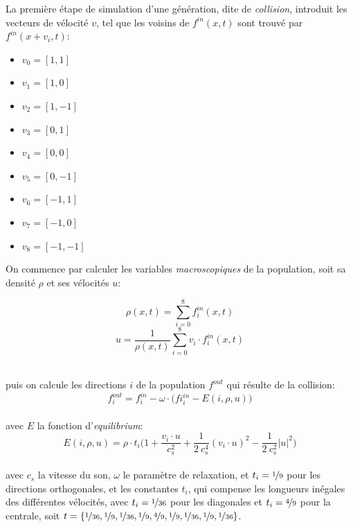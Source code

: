 La première étape de simulation d'une génération, dite de \textit{collision}, introduit les vecteurs de vélocité $v$,  tel que les voisins de $f^{in}(x, t)$ sont trouvé par $f^{in}(x+v_i,t)$: 
\begin{multicols}{3}
\begin{itemize}
\item[] $v_0 = [1,1]$
\item[] $v_1 = [1,0]$
\item[] $v_2 = [1,-1]$
\item[] $v_3 = [0,1]$
\item[] $v_4 = [0,0]$
\item[] $v_5 = [0,-1]$
\item[] $v_6 = [-1,1]$
\item[] $v_7 = [-1,0]$
\item[] $v_8 = [-1,-1]$
\end{itemize}
\end{multicols}

On commence par calculer les variables \textit{macroscopiques} de la population, soit sa densité $\rho$ et ses vélocités $u$:\\[-2\baselineskip]
\begin{multicols}{2}
\begin{equation}
\rho(x, t) = \sum_{i=0}^{8} f^{in}_i(x,t)
\end{equation}
\begin{equation}
u = \frac{1}{\rho(x,t)}\sum_{i=0}^{8} v_i \cdot f^{in}_i(x,t)
\end{equation}
\end{multicols}~\\[-0.5\baselineskip]
\noindent puis on calcule les directions $i$ de la population $f^{out}$ qui résulte de la collision:
\begin{equation}
f^{out}_i = f^{in}_i - \omega \cdot \big(fi^{in}_i - E(i, \rho, u) \big)
\end{equation}\\[-\baselineskip]

\noindent avec $E$ la fonction d'\textit{equilibrium}:
\begin{equation}
E(i, \rho, u) = \rho\cdot t_i \bigg(  1 + \frac{v_i \cdot u}{c^2_s} + \frac{1}{2~c^4_s} (v_i \cdot u)^2 - \frac{1}{2~c^2_s} |u|^2 \bigg)
\end{equation}\\[-\baselineskip]

\noindent avec $c_s$ la vitesse du son, $\omega$ le paramètre de relaxation, et $t_i = \nicefrac{1}{9}$ pour les directions orthogonales, et les constantes $t_i$, qui compense les longueurs inégales des différentes vélocités, avec $t_i =\nicefrac{1}{36}$ pour les diagonales et $t_i=\nicefrac{4}{9}$ pour la centrale, soit $t = \{\nicefrac{1}{36} , \nicefrac{1}{9}, \nicefrac{1}{36}, \nicefrac{1}{9}, \nicefrac{4}{9}, \nicefrac{1}{9}, \nicefrac{1}{36}, \nicefrac{1}{9}, \nicefrac{1}{36}\}$.

